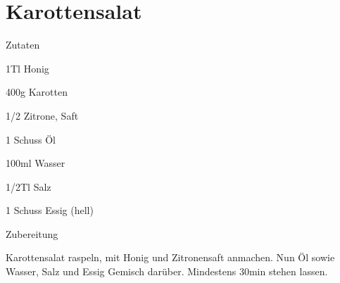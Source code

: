 \chapter*{Karottensalat}
\begin{multicols}{2}
 {\Large Zutaten}
 \begin{Zutaten}
		\item 1Tl Honig
		\item 400g Karotten
		\item 1/2 Zitrone, Saft
		\item 1 Schuss Öl
		\item 100ml Wasser
		\item 1/2Tl Salz
		\item 1 Schuss Essig (hell)
		
					
		
\end{Zutaten}
\columnbreak
\end{multicols}

{\Large Zubereitung} \newline
\begin{addmargin}[1cm]{0cm}
	Karottensalat raspeln, mit Honig und Zitronensaft anmachen.\newline
	Nun Öl sowie Wasser, Salz und Essig Gemisch darüber.\newline
	Mindestens 30min stehen lassen.
	
	
\end{addmargin}
